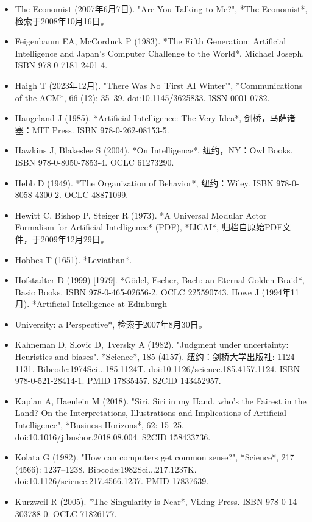 \begin{itemize}
\item The Economist (2007年6月7日). "Are You Talking to Me?", *The Economist*, 检索于2008年10月16日。  
\item Feigenbaum EA, McCorduck P (1983). *The Fifth Generation: Artificial Intelligence and Japan's Computer Challenge to the World*, Michael Joseph. ISBN 978-0-7181-2401-4.  
\item Haigh T (2023年12月). "There Was No 'First AI Winter'", *Communications of the ACM*, 66 (12): 35–39. doi:10.1145/3625833. ISSN 0001-0782.  
\item Haugeland J (1985). *Artificial Intelligence: The Very Idea*, 剑桥，马萨诸塞：MIT Press. ISBN 978-0-262-08153-5.  
\item Hawkins J, Blakeslee S (2004). *On Intelligence*, 纽约，NY：Owl Books. ISBN 978-0-8050-7853-4. OCLC 61273290.  
\item Hebb D (1949). *The Organization of Behavior*, 纽约：Wiley. ISBN 978-0-8058-4300-2. OCLC 48871099.  
\item Hewitt C, Bishop P, Steiger R (1973). *A Universal Modular Actor Formalism for Artificial Intelligence* (PDF), *IJCAI*, 归档自原始PDF文件，于2009年12月29日。  
\item Hobbes T (1651). *Leviathan*. 
\item Hofstadter D (1999) [1979]. *Gödel, Escher, Bach: an Eternal Golden Braid*, Basic Books. ISBN 978-0-465-02656-2. OCLC 225590743.  
Howe J (1994年11月). *Artificial Intelligence at Edinburgh 
\item University: a Perspective*, 检索于2007年8月30日。  
\item Kahneman D, Slovic D, Tversky A (1982). "Judgment under uncertainty: Heuristics and biases". *Science*, 185 (4157). 纽约：剑桥大学出版社: 1124–1131. Bibcode:1974Sci...185.1124T. doi:10.1126/science.185.4157.1124. ISBN 978-0-521-28414-1. PMID 17835457. S2CID 143452957.  
\item Kaplan A, Haenlein M (2018). "Siri, Siri in my Hand, who's the Fairest in the Land? On the Interpretations, Illustrations and Implications of Artificial Intelligence", *Business Horizons*, 62: 15–25. doi:10.1016/j.bushor.2018.08.004. S2CID 158433736.  
\item Kolata G (1982). "How can computers get common sense?", *Science*, 217 (4566): 1237–1238. Bibcode:1982Sci...217.1237K. doi:10.1126/science.217.4566.1237. PMID 17837639.  
\item Kurzweil R (2005). *The Singularity is Near*, Viking Press. ISBN 978-0-14-303788-0. OCLC 71826177.  

\end{itemize}

